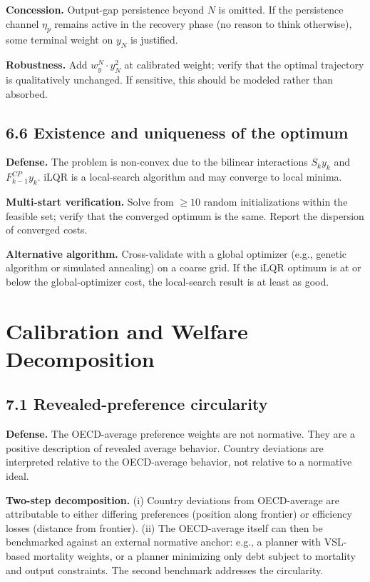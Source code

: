 \documentclass[11pt,a4paper]{article}
\begin{document}
\textbf{Concession.} Output-gap persistence beyond $N$ is omitted. If the persistence channel $\eta_p$ remains active in the recovery phase (no reason to think otherwise), some terminal weight on $y_N$ is justified.

\textbf{Robustness.} Add $w_y^N \cdot y_N^2$ at calibrated weight; verify that the optimal trajectory is qualitatively unchanged. If sensitive, this should be modeled rather than absorbed.

\subsection*{6.6 Existence and uniqueness of the optimum}

\textbf{Defense.} The problem is non-convex due to the bilinear interactions $S_k y_k$ and $F^{CP}_{k-1} y_k$. iLQR is a local-search algorithm and may converge to local minima.

\textbf{Multi-start verification.} Solve from $\geq 10$ random initializations within the feasible set; verify that the converged optimum is the same. Report the dispersion of converged costs.

\textbf{Alternative algorithm.} Cross-validate with a global optimizer (e.g., genetic algorithm or simulated annealing) on a coarse grid. If the iLQR optimum is at or below the global-optimizer cost, the local-search result is at least as good.

\section{Calibration and Welfare Decomposition}

\subsection*{7.1 Revealed-preference circularity}

\textbf{Defense.} The OECD-average preference weights are not normative. They are a positive description of revealed average behavior. Country deviations are interpreted relative to the OECD-average behavior, not relative to a normative ideal.

\textbf{Two-step decomposition.} (i) Country deviations from OECD-average are attributable to either differing preferences (position along frontier) or efficiency losses (distance from frontier). (ii) The OECD-average itself can then be benchmarked against an external normative anchor: e.g., a planner with VSL-based mortality weights, or a planner minimizing only debt subject to mortality and output constraints. The second benchmark addresses the circularity.
\end{document}

